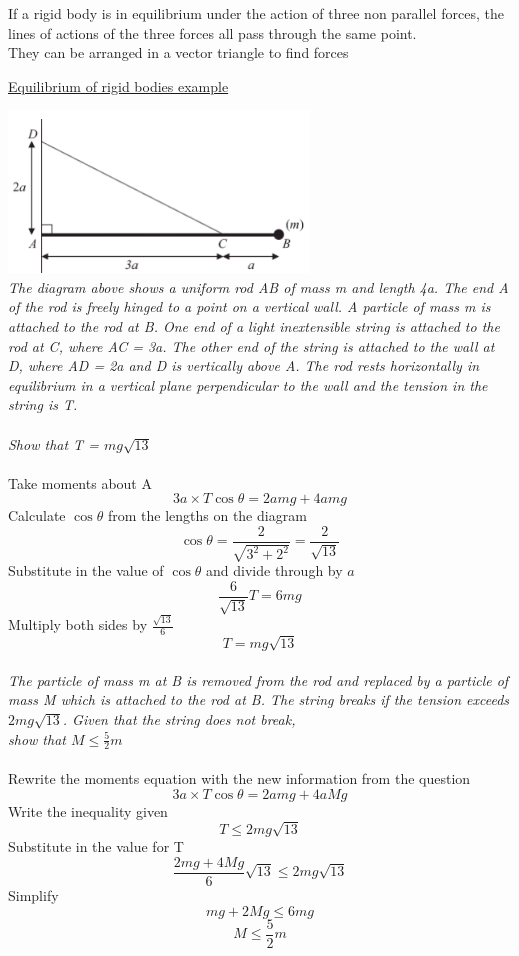 \documentclass{article}[18pt]
\begin{document}
If a rigid body is in equilibrium under the action of three non parallel forces, the lines of actions of the three forces all pass through the same point.\\
They can be arranged in a vector triangle to find forces
\newpage
\begin{center}
\underline{\Huge Equilibrium of rigid bodies example}
\end{center}
\includegraphics[width=8cm]{eq_rigid.png}\\
\textit{The diagram above shows a uniform rod AB of mass m and length 4a. The end A of the rod is
freely hinged to a point on a vertical wall. A particle of mass m is attached to the rod at B. One
end of a light inextensible string is attached to the rod at C, where AC = 3a. The other end of the
string is attached to the wall at D, where AD = 2a and D is vertically above A. The rod rests
horizontally in equilibrium in a vertical plane perpendicular to the wall and the tension in the
string is T. }\\
\\
\textit{Show that T = $mg\sqrt{13}$}\\
\\
Take moments about A 
$$3a\times T\cos\theta=2amg+4amg$$
Calculate $\cos\theta$ from the lengths on the diagram
$$\cos\theta=\frac{2}{\sqrt{3^2+2^2}}=\frac{2}{\sqrt{13}}$$
Substitute in the value of $\cos\theta$ and divide through by $a$
$$\frac{6}{\sqrt{13}}T=6mg$$
Multiply both sides by $\frac{\sqrt{13}}{6}$
$$T=mg\sqrt{13}$$
\\
\textit{The particle of mass m at B is removed from the rod and replaced by a particle of mass M which
is attached to the rod at B. The string breaks if the tension exceeds $2mg\sqrt{13}$. Given that the
string does not break,\\
show that $M\leqslant\frac{5}{2}m$}\\
\\
Rewrite the moments equation with the new information from the question
$$3a\times T\cos\theta=2amg+4aMg$$
Write the inequality given
$$T\leqslant 2mg\sqrt{13}$$
Substitute in the value for T
$$\frac{2mg+4Mg}{6}\sqrt{13}\leqslant2mg\sqrt{13}$$
Simplify
$$mg+2Mg\leqslant 6mg$$
$$M\leqslant\frac{5}{2}m$$
\end{document}
